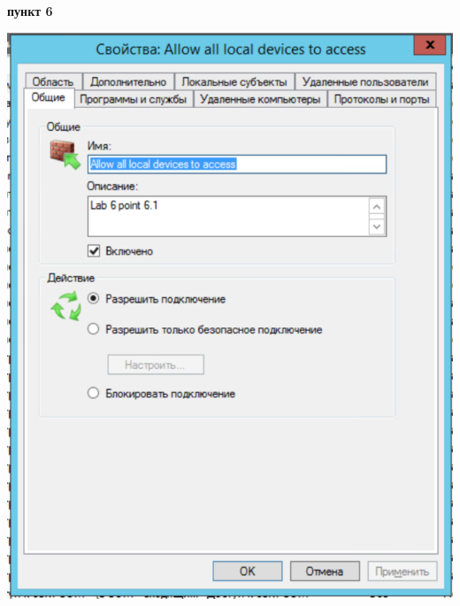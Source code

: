 \documentclass[a4paper,14pt]{extarticle}
\begin{document}
    \textbf{пункт 6}
    \begin{center}
        \includegraphics[scale=0.7]{6.1.1.png}
    \end{center}
\end{document}
